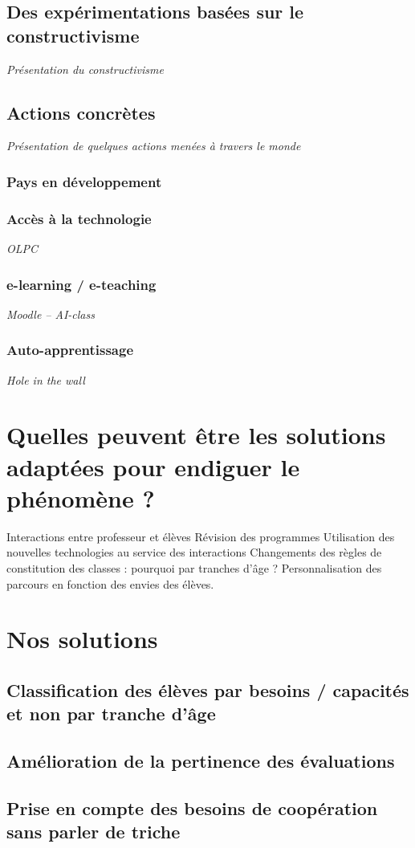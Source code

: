 \subsection{Des expérimentations basées sur le constructivisme}
\textit{Présentation du constructivisme}

\subsection{Actions concrètes}
\textit{Présentation de quelques actions menées à travers le monde}
\subsubsection{Pays en développement}
\subsubsection{Accès à la technologie}
\textit{OLPC}
\subsubsection{e-learning / e-teaching}
\textit{Moodle -- AI-class}
\subsubsection{Auto-apprentissage}
\textit{Hole in the wall}

\section{Quelles peuvent être les solutions adaptées pour endiguer le phénomène ?}\label{solutions}

Interactions entre professeur et élèves
Révision des programmes
Utilisation des nouvelles technologies au service des interactions
Changements des règles de constitution des classes : pourquoi par tranches d'âge ?
Personnalisation des parcours en fonction des envies des élèves.


\section{Nos solutions}
\subsection{Classification des élèves par besoins / capacités  et non par tranche d'âge}
\subsection{Amélioration de la pertinence des évaluations}
\subsection{Prise en compte des besoins de coopération sans parler de triche}

